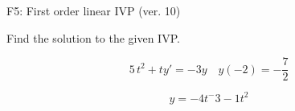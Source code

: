 \begin{exercise}
  \begin{exerciseTitle}F5: First order linear IVP (ver. 10)\end{exerciseTitle}
  \begin{exerciseStatement}
    
Find the solution to the given IVP.

    
\[5 \, t^{2} +ty'= -3 y \hspace{1em} y( -2 ) = -\frac{7}{2}\]

  \end{exerciseStatement}
  \begin{exerciseAnswer}
    
\[y= -4 t^ -3 -1 t^{2}\]

  \end{exerciseAnswer}
\end{exercise}